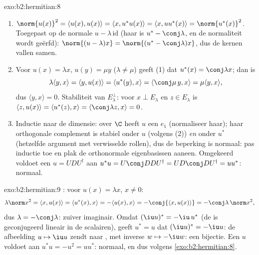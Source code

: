 \begin{solution}{exo:b2:hermitian:8}
\begin{enumerate}
  \item $\norm{u(x)}^2 = \langle u(x), u(x)\rangle = \langle x,
        u^*u(x)\rangle = \langle x, uu^*(x)\rangle =
        \norm{u^*(x)}^2$. Toegepast op de normale $u -
        \lambda\,\mathrm{id}$ (haar  is $u^* -
        \conj\lambda$, en de normaliteit wordt geërfd):
        $\norm{(u - \lambda)x} = \norm{(u^* - \conj\lambda)x}$,
        dus de kernen vallen samen.
  \item Voor  $u(x) = \lambda x$, $u(y) = \mu y$
        ($\lambda \neq \mu$) geeft (1) dat $u^*(x) = \conj\lambda
        x$; dan is
        \[
        \lambda\langle y, x\rangle = \langle y, u(x)\rangle
        = \langle u^*(y), x\rangle = \langle \conj\mu\, y, x\rangle
        = \mu \langle y, x\rangle ,
        \]
        dus $\langle y, x\rangle = 0$. Stabiliteit van
        $E_\lambda^\perp$: voor $x \perp E_\lambda$ en $z \in
        E_\lambda$ is $\langle z, u(x)\rangle = \langle u^*(z),
        x\rangle = \langle\conj\lambda z, x\rangle = 0$.
  \item Inductie naar de dimensie: over $\C$ heeft $u$ een
         $e_1$ (normaliseer haar); haar orthogonale
        complement is stabiel onder $u$ (volgens (2)) \emph{en}
        onder $u^*$ (hetzelfde argument met verwisselde rollen),
        dus de beperking is normaal: pas inductie toe en plak de
        orthonormale eigenbasissen aaneen. Omgekeerd voldoet een
          $u = UDU^\dagger$ aan $u^*u
        = U\conj D D U^\dagger = U D\conj D U^\dagger = uu^*$:
        normaal.
\end{enumerate}
\end{solution}

\begin{solution}{exo:b2:hermitian:9}
: voor $u(x) = \lambda x$, $x \neq 0$:
\[
\lambda\norm x^2 = \langle x, u(x)\rangle
= \langle u^*(x), x\rangle = -\langle u(x), x\rangle
= -\conj{\langle x, u(x)\rangle} = -\conj\lambda\,\norm x^2 ,
\]
dus $\lambda = -\conj\lambda$: zuiver imaginair. Omdat $(\iu u)^* =
-\iu\,u^*$ (de  is geconjugeerd lineair in de scalairen),
geeft $u^* = u$ dat $(\iu u)^* = -\iu u$: de afbeelding $u \mapsto
\iu u$ zendt  naar , met inverse $w \mapsto
-\iu w$: een bijectie. Een  $u$ voldoet aan $u^*u =
-u^2 = uu^*$: normaal, en dus   volgens
\cref{exo:b2:hermitian:8}.
\end{solution}

